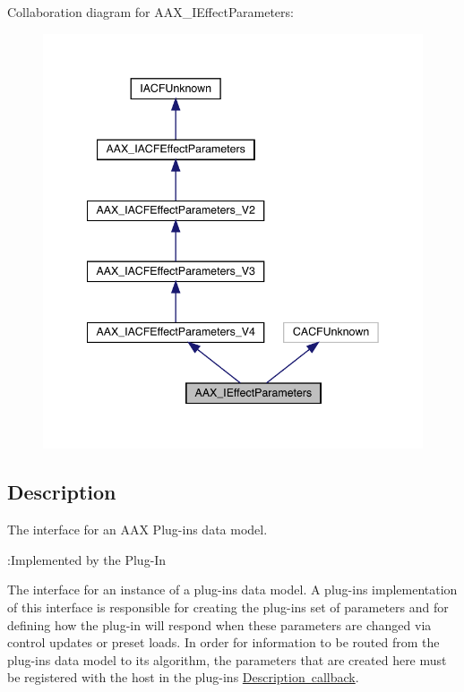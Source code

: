 Collaboration diagram for A\+A\+X\+\_\+\+I\+Effect\+Parameters\+:
\nopagebreak
\begin{figure}[H]
\begin{center}
\leavevmode
\includegraphics[width=342pt]{a01823}
\end{center}
\end{figure}


\subsection{Description}
The interface for an A\+AX Plug-\/in\textquotesingle{}s data model. 

\begin{DoxyRefDesc}{\+:\+Implemented by the Plug-\/\+In}
\item[\mbox{\hyperlink{a00791__aax_plugin_implementation000003}{\+:\+Implemented by the Plug-\/\+In}}]\end{DoxyRefDesc}


The interface for an instance of a plug-\/in\textquotesingle{}s data model. A plug-\/in\textquotesingle{}s implementation of this interface is responsible for creating the plug-\/in\textquotesingle{}s set of parameters and for defining how the plug-\/in will respond when these parameters are changed via control updates or preset loads. In order for information to be routed from the plug-\/in\textquotesingle{}s data model to its algorithm, the parameters that are created here must be registered with the host in the plug-\/in\textquotesingle{}s \mbox{\hyperlink{a00796}{Description callback}}.


